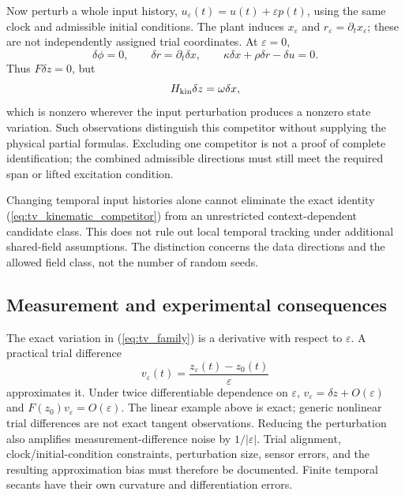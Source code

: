 \documentclass[journal]{IEEEtran}
\begin{document}
Now perturb a whole input history,
$u_\varepsilon(t)=u(t)+\varepsilon p(t)$, using the same clock and admissible
initial conditions. The plant induces $x_\varepsilon$ and
$r_\varepsilon=\partial_t x_\varepsilon$; these are not independently
assigned trial coordinates. At $\varepsilon=0$,
\begin{equation}
 \delta\phi=0,\qquad \delta r=\partial_t\delta x,\qquad
 \kappa\delta x+\rho\delta r-\delta u=0.
 \label{eq:tv_periodic_trial}
\end{equation}
Thus $F\delta z=0$, but
\begin{equation}
 H_{\rm kin}\delta z=\omega\delta x,
 \label{eq:tv_periodic_separation}
\end{equation}
which is nonzero wherever the input perturbation produces a nonzero state
variation. Such observations distinguish this competitor without supplying
the physical partial formulas. Excluding one competitor is not a proof of
complete identification; the combined admissible directions must still
meet the required span or lifted excitation condition.

Changing temporal input histories alone cannot eliminate the exact identity
(\ref{eq:tv_kinematic_competitor}) from an unrestricted context-dependent
candidate class. This does not rule out local temporal tracking under
additional shared-field assumptions. The distinction concerns the data
directions and the allowed field class, not the number of random seeds.

\subsection{Measurement and experimental consequences}
The exact variation in (\ref{eq:tv_family}) is a derivative with respect to
$\varepsilon$. A practical trial difference
\begin{equation}
 v_\varepsilon(t)=
       \frac{z_\varepsilon(t)-z_0(t)}{\varepsilon}
 \label{eq:tv_finite_trial}
\end{equation}
approximates it. Under twice differentiable dependence on $\varepsilon$,
$v_\varepsilon=\delta z+O(\varepsilon)$ and
$F(z_0)v_\varepsilon=O(\varepsilon)$. The linear example above is exact;
generic nonlinear trial differences are not exact tangent observations.
Reducing the perturbation also amplifies measurement-difference noise by
$1/|\varepsilon|$. Trial alignment, clock/initial-condition constraints,
perturbation size, sensor errors, and the resulting approximation bias must
therefore be documented. Finite temporal secants have their own curvature
and differentiation errors.
\end{document}
